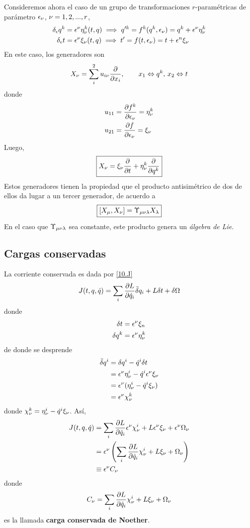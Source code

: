 Consideremos ahora el caso de un grupo de transformaciones $r$-paramétricas de parámetro $\epsilon_\nu $, $\nu =1,2,...,r$,
\begin{align}
  \delta_\epsilon q^k&=\epsilon^\nu \eta^k_\nu (t,q)\implies q'^k=f^k(q^k,\epsilon_\nu )=q^k+\epsilon^\nu \eta^k_\nu \\
  \delta_\epsilon t&=\epsilon^\nu \xi_\nu (t,q)\implies t'=f(t,\epsilon_\nu )=t+\epsilon^n \xi_\nu 
\end{align}
En este caso, los generadores son
\begin{align}
  X_{\nu }=\sum_i^2 u_{i\nu }\pdv{x_i},\qquad x_1\Leftrightarrow q^k,\, x_2\Leftrightarrow t
\end{align}
donde
\begin{align}
  u_{11}&=\pdv{f^k}{\epsilon_\nu}=\eta^k_\nu \\
  u_{21}&=\pdv{f}{\epsilon_\nu}=\xi_\nu 
\end{align}
Luego,
\begin{equation}
\boxed{  X_\nu =\xi_\nu \pdv{t}+\eta^k_\nu \pdv{q^k}}
\end{equation}
Estos generadores tienen la propiedad que el producto antisimétrico de dos de ellos da lugar a un tercer generador, de acuerdo a
\begin{equation}
 \boxed{ [X_\mu ,X_\nu ]=\Upsilon_{\mu\nu\lambda}X_\lambda}
\end{equation}
En el caso que $\Upsilon_{\mu\nu\lambda}$ sea constante, este producto genera un \textit{álgebra de Lie}.

\subsection{Cargas conservadas}
La corriente conservada es dada por \eqref{10.J} 
\begin{equation}
   J(t,q,\dot{q})=\sum_i\pdv{L}{\dot{q}_i}\bar{\delta} q_i+L\delta t+\delta\Omega
\end{equation}
donde
\begin{align}
  \delta t&=\epsilon^\nu \xi_n\\
  \delta q^k&=\epsilon^\nu \eta^k_\nu 
\end{align}
de donde se desprende
\begin{align}
  \bar{\delta} q^{i}&=\delta q^{i}-\dot{q}^{i}\delta t\\
  &=\epsilon^\nu \eta^{i}_\nu -\dot{q}^{i}\epsilon^\nu \xi_\nu \\
  &=\epsilon^\nu (\eta^{i}_\nu -\dot{q}^{i} \xi_\nu )\\
  &=\epsilon^\nu \chi ^k_\nu 
\end{align}
donde $\chi^k_\nu =\eta^{i}_\nu -\dot{q}^{i} \xi_\nu $. Así,
\begin{align}
  J(t,q,\dot{q})&=\sum_i\pdv{L}{\dot{q}_i}\epsilon^\nu \chi^{i}_\nu +L\epsilon^\nu \xi_\nu +\epsilon^\nu \Omega_\nu \\
  &=\epsilon^\nu \left(\sum_i\pdv{L}{\dot{q}_i} \chi^{i}_\nu +L \xi_\nu +\Omega_\nu \right)\\
  &\equiv \epsilon^\nu C_\nu 
\end{align}
donde
\begin{equation}
  C_\nu =\sum_i\pdv{L}{\dot{q}_i} \chi^{i}_\nu +L \xi_\nu +\Omega_\nu 
\end{equation}
es la llamada \textbf{carga conservada de Noether}.

